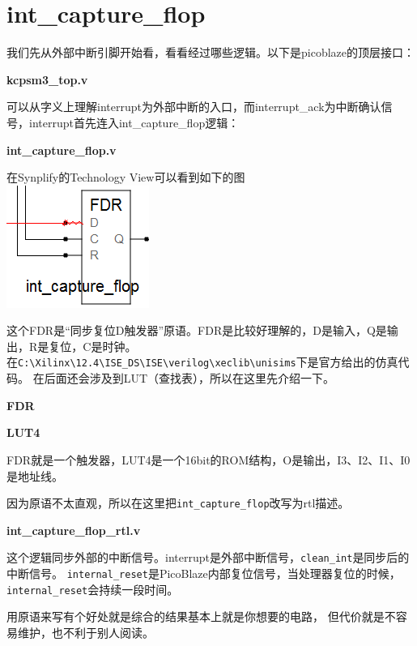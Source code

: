 \section{int\_capture\_flop}
我们先从外部中断引脚开始看，看看经过哪些逻辑。以下是picoblaze的顶层接口：

\textbf{kcpsm3\_top.v}


\newpage
可以从字义上理解interrupt为外部中断的入口，而interrupt\_ack为中断确认信号，interrupt首先连入int\_capture\_flop逻辑：

\textbf{int\_capture\_flop.v}


在Synplify的Technology View可以看到如下的图\\
\includegraphics{int_capture_flop.png}

这个FDR是“同步复位D触发器”原语。FDR是比较好理解的，D是输入，Q是输出，R是复位，C是时钟。\\
在\verb|C:\Xilinx\12.4\ISE_DS\ISE\verilog\xeclib\unisims|下是官方给出的仿真代码。
在后面还会涉及到LUT（查找表），所以在这里先介绍一下。

\textbf{FDR}


\textbf{LUT4}


FDR就是一个触发器，LUT4是一个16bit的ROM结构，O是输出，I3、I2、I1、I0是地址线。

因为原语不太直观，所以在这里把\verb|int_capture_flop|改写为rtl描述。

\textbf{int\_capture\_flop\_rtl.v}


这个逻辑同步外部的中断信号。interrupt是外部中断信号，\verb|clean_int|是同步后的中断信号。 \verb|internal_reset|是PicoBlaze内部复位信号，当处理器复位的时候，\verb|internal_reset|会持续一段时间。

用原语来写有个好处就是综合的结果基本上就是你想要的电路，
但代价就是不容易维护，也不利于别人阅读。

